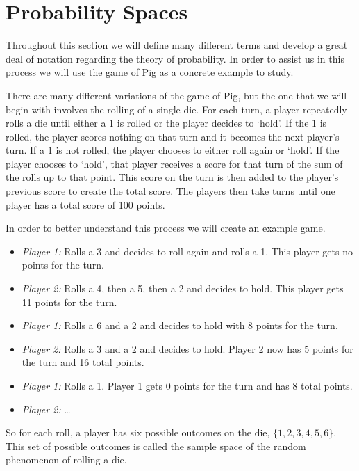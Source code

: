 \documentclass[
]{book}
\providecommand{\tightlist}{%
  \setlength{\itemsep}{0pt}\setlength{\parskip}{0pt}}
\theoremstyle{definition}
\theoremstyle{definition}
\theoremstyle{definition}
\theoremstyle{definition}
\theoremstyle{remark}
\begin{document}
\hypertarget{probability-spaces}{%
\section{Probability Spaces}\label{probability-spaces}}

Throughout this section we will define many different terms and develop a great deal of notation regarding the theory of probability. In order to assist us in this process we will use the game of Pig as a concrete example to study.

There are many different variations of the game of Pig, but the one that we will begin with involves the rolling of a single die. For each turn, a player repeatedly rolls a die until either a \(1\) is rolled or the player decides to `hold'. If the \(1\) is rolled, the player scores nothing on that turn and it becomes the next player's turn. If a \(1\) is not rolled, the player chooses to either roll again or `hold'. If the player chooses to `hold', that player receives a score for that turn of the sum of the rolls up to that point. This score on the turn is then added to the player's previous score to create the total score. The players then take turns until one player has a total score of 100 points.

In order to better understand this process we will create an example game.

\begin{itemize}
\tightlist
\item
  \emph{Player 1:} Rolls a 3 and decides to roll again and rolls a 1. This player gets no points for the turn.
\item
  \emph{Player 2:} Rolls a 4, then a 5, then a 2 and decides to hold. This player gets 11 points for the turn.
\item
  \emph{Player 1:} Rolls a 6 and a 2 and decides to hold with 8 points for the turn.
\item
  \emph{Player 2:} Rolls a 3 and a 2 and decides to hold. Player 2 now has 5 points for the turn and 16 total points.
\item
  \emph{Player 1:} Rolls a 1. Player 1 gets 0 points for the turn and has 8 total points.
\item
  \emph{Player 2:} \ldots{}
\end{itemize}

So for each roll, a player has six possible outcomes on the die, \(\{1,2,3,4,5,6\}\). This set of possible outcomes is called the sample space of the random phenomenon of rolling a die.
\end{document}
